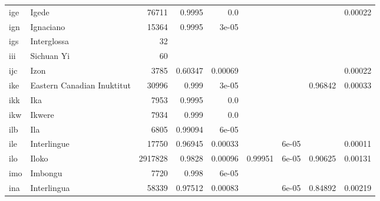 \documentclass[11pt]{article}
\begin{document}
\begin{table*}[h]
{\begin{tabular}{llrrrrrrr}
ige         & Igede         & 76711         & 0.9995         & 0.0         &          &          &          & 0.00022         \\

ign         & Ignaciano         & 15364         & 0.9995         & 3e-05         &          &          &          &          \\

igs         & Interglossa         & 32         &          &          &          &          &          &          \\

iii         & Sichuan Yi         & 60         &          &          &          &          &          &          \\

ijc         & Izon         & 3785         & 0.60347         & 0.00069         &          &          &          & 0.00022         \\

ike         & Eastern Canadian Inuktitut         & 30996         & 0.999         & 3e-05         &          &          & 0.96842         & 0.00033         \\

ikk         & Ika         & 7953         & 0.9995         & 0.0         &          &          &          &          \\

ikw         & Ikwere         & 7934         & 0.999         & 0.0         &          &          &          &          \\

ilb         & Ila         & 6805         & 0.99094         & 6e-05         &          &          &          &          \\

ile         & Interlingue         & 17750         & 0.96945         & 0.00033         &          & 6e-05         &          & 0.00011         \\

ilo         & Iloko         & 2917828         & 0.9828         & 0.00096         & 0.99951         & 6e-05         & 0.90625         & 0.00131         \\

imo         & Imbongu         & 7720         & 0.998         & 6e-05         &          &          &          &          \\

ina         & Interlingua         & 58339         & 0.97512         & 0.00083         &          & 6e-05         & 0.84892         & 0.00219         \\


\end{tabular}}
\end{table*}
\end{document}
